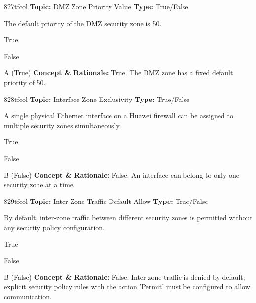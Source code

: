 \begin{qcard}{827}{tfcol}
\textcolor{darkslate!75}{\small\textbf{Topic:} DMZ Zone Priority Value \hfill \textbf{Type:} True/False}\vspace{0.4em}\par
The default priority of the DMZ security zone is 50.
\begin{qoptions}
\item True
\item False
\end{qoptions}
\end{qcard}
\nopagebreak
\begin{explainbox}{A (True)}
\textbf{Concept \& Rationale:} True. The DMZ zone has a fixed default priority of 50.
\end{explainbox}

\begin{qcard}{828}{tfcol}
\textcolor{darkslate!75}{\small\textbf{Topic:} Interface Zone Exclusivity \hfill \textbf{Type:} True/False}\vspace{0.4em}\par
A single physical Ethernet interface on a Huawei firewall can be assigned to multiple security zones simultaneously.
\begin{qoptions}
\item True
\item False
\end{qoptions}
\end{qcard}
\nopagebreak
\begin{explainbox}{B (False)}
\textbf{Concept \& Rationale:} False. An interface can belong to only one security zone at a time.
\end{explainbox}

\begin{qcard}{829}{tfcol}
\textcolor{darkslate!75}{\small\textbf{Topic:} Inter-Zone Traffic Default Allow \hfill \textbf{Type:} True/False}\vspace{0.4em}\par
By default, inter-zone traffic between different security zones is permitted without any security policy configuration.
\begin{qoptions}
\item True
\item False
\end{qoptions}
\end{qcard}
\nopagebreak
\begin{explainbox}{B (False)}
\textbf{Concept \& Rationale:} False. Inter-zone traffic is denied by default; explicit security policy rules with the action 'Permit' must be configured to allow communication.
\end{explainbox}

